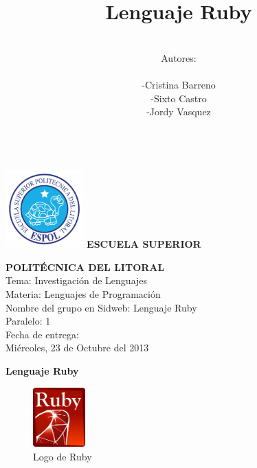 \documentclass[11pt]{article} %
\title{\fontsize{30}{0} \bf Lenguaje Ruby}
\author{\\Autores: \\  \\-Cristina Barreno \\ -Sixto Castro \\ -Jordy Vasquez\\ \\}
\begin{document}
\newpage

 \includegraphics[width=3cm]{./imagenes/Espol.png}{ \fontsize{18}{0} \bf ESCUELA SUPERIOR \\}
\begin{center}
{\fontsize{18}{0} \bf POLITÉCNICA DEL LITORAL\\}
\vspace{2cm}
{\LARGE{ Tema: Investigación de Lenguajes }}\\
\vspace{2cm}
{\LARGE{ Materia: Lenguajes de Programación }}\\
\vspace{2cm}
{\LARGE{  Nombre del grupo en Sidweb: Lenguaje Ruby}}\\ 
\vspace{2cm}
{\LARGE{ Paralelo: 1}}\\
\vspace{2cm}
{\LARGE{Fecha de entrega: \\  Miércoles, 23 de Octubre del 2013}}
\thispagestyle{empty}
\end{center}


\maketitle

\newpage
\tableofcontents %
\thispagestyle{empty}

\newpage
\begin{center}
 {\fontsize{16}{0} \bf Lenguaje Ruby}
\end{center}

\begin{figure}[h]
\centering
 \includegraphics[width=2cm]{./imagenes/ruby.jpg}
\caption{Logo de Ruby }\label{Fig:Ruby}
\end{figure}
\end{document}
